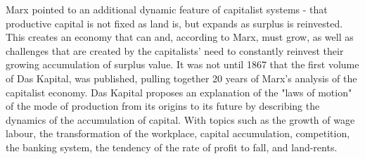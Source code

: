 Marx pointed to an additional dynamic feature of  capitalist systems - that productive capital is not fixed as land is, but  expands as surplus is reinvested. This creates an economy that can and, according to Marx, must grow, as well as challenges that are created by the capitalists' need to constantly reinvest their growing accumulation of surplus value. It was not until 1867 that  the first volume of Das Kapital,  was published, pulling together 20 years of Marx's analysis of the capitalist economy.  Das Kapital proposes an explanation of the "laws of motion" of the mode of production from its origins to its future by describing the dynamics of the accumulation of capital. With topics such as the growth of wage labour, the transformation of the workplace, capital accumulation, competition, the banking system, the tendency of the rate of profit to fall, and land-rents.%




